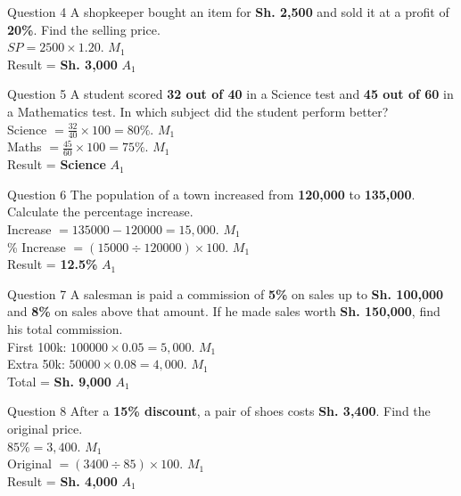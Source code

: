 \documentclass[12pt, a4paper, oneside]{article}
\begin{document}
\begin{solvingbox}{Question 4}
A shopkeeper bought an item for \textbf{Sh. 2,500} and sold it at a profit of \textbf{20\%}. Find the selling price. \\
$SP = 2500 \times 1.20$. \hfill $M_1$ \\
Result = \textbf{Sh. 3,000} \hfill $A_1$
\end{solvingbox}

\begin{solvingbox}{Question 5}
A student scored \textbf{32 out of 40} in a Science test and \textbf{45 out of 60} in a Mathematics test. In which subject did the student perform better? \\
Science $= \frac{32}{40} \times 100 = 80\%$. \hfill $M_1$ \\
Maths $= \frac{45}{60} \times 100 = 75\%$. \hfill $M_1$ \\
Result = \textbf{Science} \hfill $A_1$
\end{solvingbox}

\begin{solvingbox}{Question 6}
The population of a town increased from \textbf{120,000} to \textbf{135,000}. Calculate the percentage increase. \\
Increase $= 135000 - 120000 = 15,000$. \hfill $M_1$ \\
\% Increase $= (15000 \div 120000) \times 100$. \hfill $M_1$ \\
Result = \textbf{12.5\%} \hfill $A_1$
\end{solvingbox}

\begin{solvingbox}{Question 7}
A salesman is paid a commission of \textbf{5\%} on sales up to \textbf{Sh. 100,000} and \textbf{8\%} on sales above that amount. If he made sales worth \textbf{Sh. 150,000}, find his total commission. \\
First 100k: $100000 \times 0.05 = 5,000$. \hfill $M_1$ \\
Extra 50k: $50000 \times 0.08 = 4,000$. \hfill $M_1$ \\
Total = \textbf{Sh. 9,000} \hfill $A_1$
\end{solvingbox}

\begin{solvingbox}{Question 8}
After a \textbf{15\% discount}, a pair of shoes costs \textbf{Sh. 3,400}. Find the original price. \\
$85\% = 3,400$. \hfill $M_1$ \\
Original $= (3400 \div 85) \times 100$. \hfill $M_1$ \\
Result = \textbf{Sh. 4,000} \hfill $A_1$
\end{solvingbox}
\end{document}
